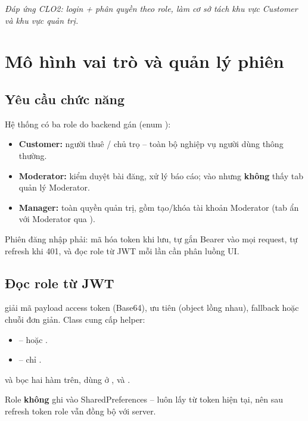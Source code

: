 \textit{Đáp ứng CLO2: login + phân quyền theo role, làm cơ sở tách khu
vực Customer và khu vực quản trị.}

\section{Mô hình vai trò và quản lý phiên}
\label{sec:c2_role}

\subsection{Yêu cầu chức năng}
Hệ thống có ba role do backend gán (enum ):
\begin{itemize}
    \item \textbf{Customer:} người thuê / chủ trọ -- toàn bộ nghiệp vụ
    người dùng thông thường.
    \item \textbf{Moderator:} kiểm duyệt bài đăng, xử lý báo cáo; vào
     nhưng \textbf{không} thấy tab quản lý Moderator.
    \item \textbf{Manager:} toàn quyền quản trị, gồm tạo/khóa tài khoản
    Moderator (tab ẩn với Moderator qua ).
\end{itemize}

Phiên đăng nhập phải: mã hóa token khi lưu, tự gắn Bearer vào mọi request,
tự refresh khi 401, và đọc role từ JWT mỗi lần cần phân luồng UI.

\subsection{Đọc role từ JWT}
 giải mã payload access token (Base64),
ưu tiên  (object lồng nhau), fallback
 hoặc chuỗi  đơn giản. Class  cung
cấp helper:
\begin{itemize}
    \item {} --  hoặc .
    \item {} -- chỉ .
\end{itemize}
 và  bọc hai hàm
trên, dùng ở ,  và
.

Role \textbf{không} ghi vào SharedPreferences -- luôn lấy từ token hiện
tại, nên sau refresh token role vẫn đồng bộ với server.

